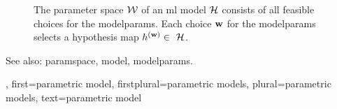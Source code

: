 {{\begin{figure}[H]
\begin{center}
			\end{center} 
			\caption{The \gls{parameter} space $\mathcal{W}$ of an \gls{ml} \gls{model} $\mathcal{H}$ consists of all 
			feasible choices for the \glspl{modelparam}. Each choice ${\bf w}$ for the \glspl{modelparam} 
			selects a \gls{hypothesis} \gls{map} $\hypothesis^{(\weights)} \in \hypospace$.
				 \label{fig_param_model_dict}} 
			\end{figure}
			See also: \gls{paramspace}, \gls{model}, \glspl{modelparam}.},
		first={parametric model},
		firstplural={parametric models},
		plural={parametric models},
		text={parametric model}
}


